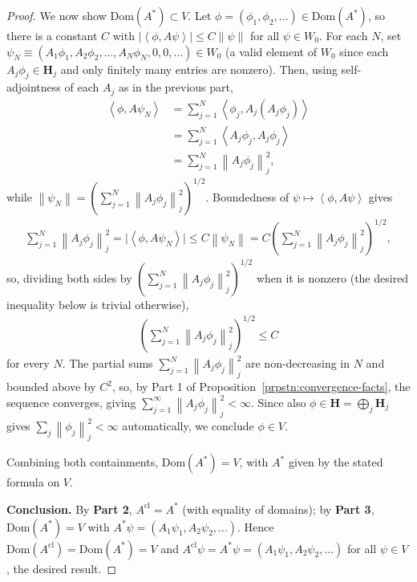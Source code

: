 \begin{proof}
We now show $\text{Dom}(A^*) \subset V$. Let $\phi = (\phi_1, \phi_2, \ldots) \in \text{Dom}(A^*)$, so there is a constant $C$ with $\lvert \left< \phi, A\psi \right> \rvert \le C \left\| \psi \right\|$ for all $\psi \in W_0$. For each $N$, set $\psi_N \equiv (A_1\phi_1, A_2\phi_2, \ldots, A_N\phi_N, 0, 0, \ldots) \in W_0$ (a valid element of $W_0$ since each $A_j\phi_j \in \mathbf{H}_j$ and only finitely many entries are nonzero). Then, using self-adjointness of each $A_j$ as in the previous part,
\begin{align}
    \left< \phi, A\psi_N \right> &= \sum_{j=1}^N \left< \phi_j, A_j(A_j\phi_j) \right> \\
                &= \sum_{j=1}^N \left< A_j\phi_j, A_j\phi_j \right> \\
                &= \sum_{j=1}^N \left\| A_j\phi_j \right\|_j^2,
\end{align}
while $\left\| \psi_N \right\| = \left( \sum_{j=1}^N \left\| A_j\phi_j \right\|_j^2 \right)^{1/2}$. Boundedness of $\psi \mapsto \left< \phi, A\psi \right>$ gives
\begin{align}
    \sum_{j=1}^N \left\| A_j\phi_j \right\|_j^2 = \lvert \left< \phi, A\psi_N \right> \rvert \le C \left\| \psi_N \right\| = C \left( \sum_{j=1}^N \left\| A_j\phi_j \right\|_j^2 \right)^{1/2},
\end{align}
so, dividing both sides by $\left( \sum_{j=1}^N \left\| A_j\phi_j \right\|_j^2 \right)^{1/2}$ when it is nonzero (the desired inequality below is trivial otherwise),
\begin{align}
    \left( \sum_{j=1}^N \left\| A_j\phi_j \right\|_j^2 \right)^{1/2} \le C
\end{align}
for every $N$. The partial sums $\sum_{j=1}^N \left\| A_j\phi_j \right\|_j^2$ are non-decreasing in $N$ and bounded above by $C^2$, so, by Part 1 of Proposition~\ref{prpstn:convergence-facts}, the sequence converges, giving $\sum_{j=1}^\infty \left\| A_j\phi_j \right\|_j^2 < \infty$. Since also $\phi \in \mathbf{H} = \bigoplus_j \mathbf{H}_j$ gives $\sum_j \left\| \phi_j \right\|_j^2 < \infty$ automatically, we conclude $\phi \in V$.

Combining both containments, $\text{Dom}(A^*) = V$, with $A^*$ given by the stated formula on $V$.

\textbf{Conclusion.} By \textbf{Part 2}, $A^{\text{cl}} = A^*$ (with equality of domains); by \textbf{Part 3}, $\text{Dom}(A^*) = V$ with $A^*\psi = (A_1\psi_1, A_2\psi_2, \ldots)$. Hence $\text{Dom}(A^{\text{cl}}) = \text{Dom}(A^*) = V$ and $A^{\text{cl}}\psi = A^*\psi = (A_1\psi_1, A_2\psi_2, \ldots)$ for all $\psi \in V$, the desired result.
\end{proof}

